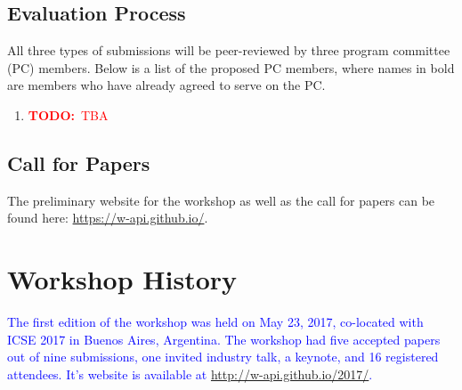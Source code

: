 \documentclass[10pt, conference]{IEEEtran}
\newcommand{\todo}[1]{{\textcolor{red}{\textbf{TODO:}~#1}}}
\newcommand{\updated}[1]{{\textcolor{blue}{#1}}}
\begin{document}
\subsection{Evaluation Process}
All three types of submissions will be peer-reviewed by three program committee (PC) members. Below is a list of the proposed PC members, where names in bold are members who have already agreed to serve on the PC.

\begin{enumerate}
\setlength\itemsep{5pt}
\item \todo{TBA}
\end{enumerate}

\subsection{Call for Papers}
The preliminary website for the workshop as well as the call for papers can be found here: \url{https://w-api.github.io/}.

\section{Workshop History}

\updated{The first edition of the workshop was held on May 23, 2017, co-located with ICSE 2017 in Buenos Aires, Argentina. The workshop had five accepted papers out of nine submissions, one invited industry talk, a keynote, and 16 registered attendees. It's website is available at \url{http://w-api.github.io/2017/}.}
\end{document}
